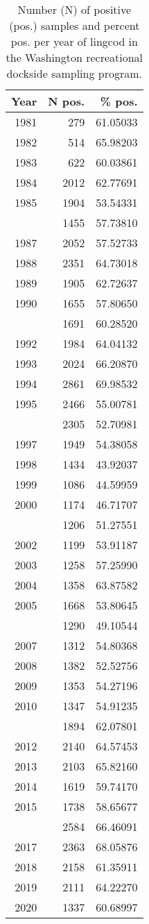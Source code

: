 
\begin{longtable}[t]{rrr}
\caption{\label{tab:reccpuewa-n}Number (N) of positive (pos.) samples and percent pos. per year of lingcod in the Washington recreational dockside sampling program.}\\
\toprule
Year & N pos. & \% pos.\\
\midrule
1981 & 279 & 61.05033\\
1982 & 514 & 65.98203\\
1983 & 622 & 60.03861\\
1984 & 2012 & 62.77691\\
1985 & 1904 & 53.54331\\
\addlinespace
1986 & 1455 & 57.73810\\
1987 & 2052 & 57.52733\\
1988 & 2351 & 64.73018\\
1989 & 1905 & 62.72637\\
1990 & 1655 & 57.80650\\
\addlinespace
1991 & 1691 & 60.28520\\
1992 & 1984 & 64.04132\\
1993 & 2024 & 66.20870\\
1994 & 2861 & 69.98532\\
1995 & 2466 & 55.00781\\
\addlinespace
1996 & 2305 & 52.70981\\
1997 & 1949 & 54.38058\\
1998 & 1434 & 43.92037\\
1999 & 1086 & 44.59959\\
2000 & 1174 & 46.71707\\
\addlinespace
2001 & 1206 & 51.27551\\
2002 & 1199 & 53.91187\\
2003 & 1258 & 57.25990\\
2004 & 1358 & 63.87582\\
2005 & 1668 & 53.80645\\
\addlinespace
2006 & 1290 & 49.10544\\
2007 & 1312 & 54.80368\\
2008 & 1382 & 52.52756\\
2009 & 1353 & 54.27196\\
2010 & 1347 & 54.91235\\
\addlinespace
2011 & 1894 & 62.07801\\
2012 & 2140 & 64.57453\\
2013 & 2103 & 65.82160\\
2014 & 1619 & 59.74170\\
2015 & 1738 & 58.65677\\
\addlinespace
2016 & 2584 & 66.46091\\
2017 & 2363 & 68.05876\\
2018 & 2158 & 61.35911\\
2019 & 2111 & 64.22270\\
2020 & 1337 & 60.68997\\
\bottomrule
\end{longtable}
